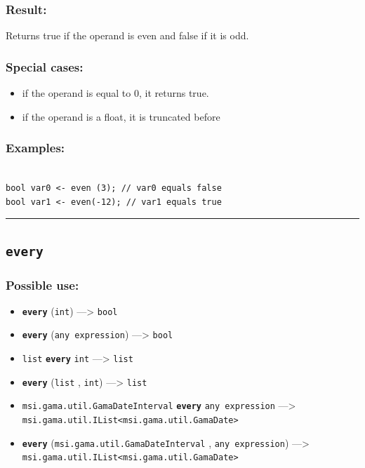 \documentclass[]{book}
\providecommand{\tightlist}{%
  \setlength{\itemsep}{0pt}\setlength{\parskip}{0pt}}
\theoremstyle{definition}
\theoremstyle{definition}
\theoremstyle{definition}
\theoremstyle{remark}
\begin{document}
\subsubsection{Result:}\label{result-151}

Returns true if the operand is even and false if it is odd.

\subsubsection{Special cases:}\label{special-cases-56}

\begin{itemize}
\tightlist
\item
  if the operand is equal to 0, it returns true.\\
\item
  if the operand is a float, it is truncated before
\end{itemize}

\subsubsection{Examples:}\label{examples-116}

\begin{verbatim}
 
bool var0 <- even (3); // var0 equals false 
bool var1 <- even(-12); // var1 equals true
\end{verbatim}

\begin{center}\rule{0.5\linewidth}{\linethickness}\end{center}

\subsection{\texorpdfstring{\texttt{every}}{every}}\label{every}

\subsubsection{Possible use:}\label{possible-use-158}

\begin{itemize}
\tightlist
\item
  \textbf{\texttt{every}} (\texttt{int}) ---\textgreater{} \texttt{bool}
\item
  \textbf{\texttt{every}} (\texttt{any\ expression}) ---\textgreater{}
  \texttt{bool}
\item
  \texttt{list} \textbf{\texttt{every}} \texttt{int} ---\textgreater{}
  \texttt{list}
\item
  \textbf{\texttt{every}} (\texttt{list} , \texttt{int})
  ---\textgreater{} \texttt{list}
\item
  \texttt{msi.gama.util.GamaDateInterval} \textbf{\texttt{every}}
  \texttt{any\ expression} ---\textgreater{}
  \texttt{msi.gama.util.IList\textless{}msi.gama.util.GamaDate\textgreater{}}
\item
  \textbf{\texttt{every}} (\texttt{msi.gama.util.GamaDateInterval} ,
  \texttt{any\ expression}) ---\textgreater{}
  \texttt{msi.gama.util.IList\textless{}msi.gama.util.GamaDate\textgreater{}}
\end{itemize}
\end{document}
